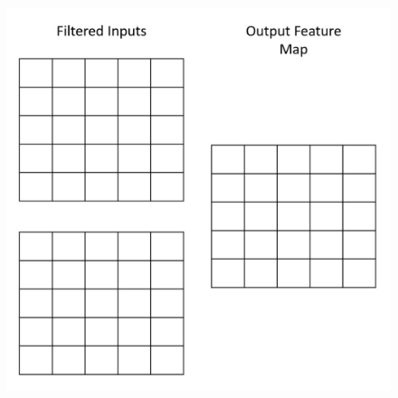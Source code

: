 \begin{figure}[H]
	\centering
	\includegraphics[width=.35\linewidth]{images/conv_question_blanks_1.png}
\end{figure}

\begin{tcolorbox}[title=Solution]
\end{tcolorbox}
